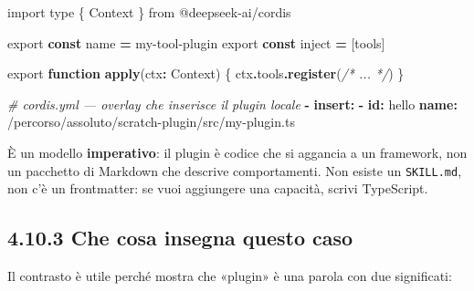 \documentclass[
  italian,
  10pt,
]{book}
\newenvironment{Shaded}{\begin{snugshade}}{\end{snugshade}}
\newcommand{\AttributeTok}[1]{\textcolor[rgb]{0.13,0.29,0.53}{#1}}
\newcommand{\CommentTok}[1]{\textcolor[rgb]{0.56,0.35,0.01}{\textit{#1}}}
\newcommand{\FunctionTok}[1]{\textcolor[rgb]{0.13,0.29,0.53}{\textbf{#1}}}
\newcommand{\ImportTok}[1]{#1}
\newcommand{\KeywordTok}[1]{\textcolor[rgb]{0.13,0.29,0.53}{\textbf{#1}}}
\newcommand{\NormalTok}[1]{#1}
\newcommand{\OperatorTok}[1]{\textcolor[rgb]{0.81,0.36,0.00}{\textbf{#1}}}
\newcommand{\StringTok}[1]{\textcolor[rgb]{0.31,0.60,0.02}{#1}}
\begin{document}
\begin{Shaded}
\begin{Highlighting}[]
\ImportTok{import} \ImportTok{type}\NormalTok{ \{ Context \} }\ImportTok{from} \StringTok{\textquotesingle{}@deepseek{-}ai/cordis\textquotesingle{}}

\ImportTok{export} \KeywordTok{const}\NormalTok{ name }\OperatorTok{=} \StringTok{\textquotesingle{}my{-}tool{-}plugin\textquotesingle{}}
\ImportTok{export} \KeywordTok{const}\NormalTok{ inject }\OperatorTok{=}\NormalTok{ [}\StringTok{\textquotesingle{}tools\textquotesingle{}}\NormalTok{]}

\ImportTok{export} \KeywordTok{function} \FunctionTok{apply}\NormalTok{(ctx}\OperatorTok{:}\NormalTok{ Context) \{}
\NormalTok{  ctx}\OperatorTok{.}\AttributeTok{tools}\OperatorTok{.}\FunctionTok{register}\NormalTok{(}\CommentTok{/* ... */}\NormalTok{)}
\NormalTok{\}}
\end{Highlighting}
\end{Shaded}

\begin{Shaded}
\begin{Highlighting}[]
\CommentTok{\# cordis.yml — overlay che inserisce il plugin locale}
\KeywordTok{{-} }\FunctionTok{insert}\KeywordTok{:}
\AttributeTok{    }\KeywordTok{{-} }\FunctionTok{id}\KeywordTok{:}\AttributeTok{ hello}
\AttributeTok{      }\FunctionTok{name}\KeywordTok{:}\AttributeTok{ }\StringTok{\textquotesingle{}/percorso/assoluto/scratch{-}plugin/src/my{-}plugin.ts\textquotesingle{}}
\end{Highlighting}
\end{Shaded}

È un modello \textbf{imperativo}: il plugin è codice che si aggancia a
un framework, non un pacchetto di Markdown che descrive comportamenti.
Non esiste un \texttt{SKILL.md}, non c'è un frontmatter: se vuoi
aggiungere una capacità, scrivi TypeScript.

\subsection{4.10.3 Che cosa insegna questo
caso}\label{che-cosa-insegna-questo-caso}

Il contrasto è utile perché mostra che «plugin» è una parola con due
significati:
\end{document}
